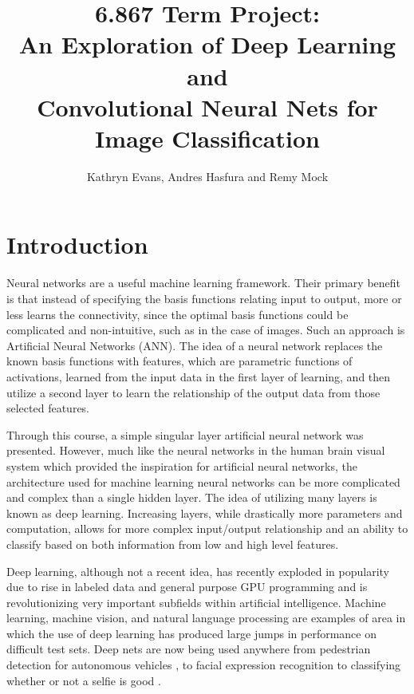 \documentclass[12pt, twocolumn]{article}
\begin{document}
\title{ 6.867 Term Project: \\ An Exploration of Deep Learning and \\ Convolutional Neural Nets for Image Classification\\ }
 \author{Kathryn Evans, Andres Hasfura and Remy Mock}
\maketitle

\section{ Introduction} 
Neural networks are a useful machine learning framework. Their primary benefit is that instead of specifying the basis functions relating input to output,  more or less learns the connectivity, since the optimal basis functions could be complicated and non-intuitive, such as in the case of images. Such an approach is Artificial Neural Networks (ANN). The idea of a neural network replaces the known basis functions with features, which are parametric functions of activations, learned from the input data in the first layer of learning, and then utilize a second layer to learn the relationship of the output data from those selected features.

Through this course, a simple singular layer artificial neural network was presented. However, much like the neural networks in the human brain visual system which provided the inspiration for artificial neural networks, the architecture used for machine learning neural networks can be more complicated and complex than a single hidden layer. The idea of utilizing many layers is known as deep learning.  Increasing layers, while drastically more parameters and computation,  allows for more complex input/output relationship and an ability to classify based on both information from low and high level features.

Deep learning, although not a recent idea, has recently exploded in popularity due to rise in labeled data and general purpose GPU programming and is revolutionizing very important subfields within artificial intelligence. Machine learning, machine vision, and natural language processing are examples of area in which the use of deep learning has produced large jumps in performance on difficult test sets. Deep nets are now being used anywhere from pedestrian detection for autonomous vehicles \cite{Szarvas2006}, to facial expression recognition \cite{Li2015} to classifying whether or not a selfie is good \cite{Karpathy}. 
	
\end{document}
